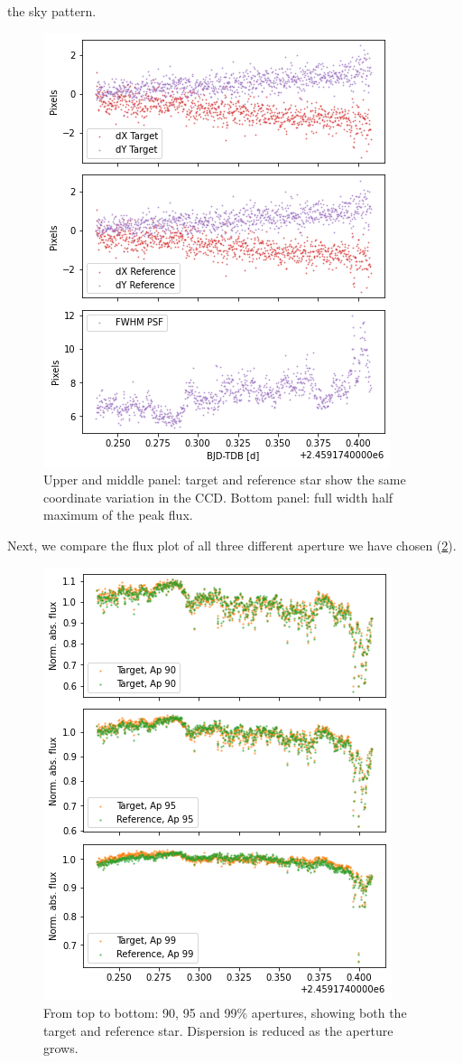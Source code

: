 \documentclass[a4paper,11pt,twocolumn]{article}
\begin{document}
the sky pattern.
\begin{figure}
    \centering  
    \includegraphics[scale=0.5, angle=0]{../pictures/taste/target-ref_position.png}
    \caption{Upper and middle panel: target and reference star show the same 
    coordinate variation in the CCD. Bottom panel: full width half maximum 
    of the peak flux.}
    \label{fig:target-ref_position}
\end{figure}
Next, we compare the flux plot of all three different aperture we have 
chosen (\ref{fig:apertures}).
\begin{figure}
    \centering  
    \includegraphics[scale=0.5, angle=0]{../pictures/taste/apertures.png}
    \caption{From top to bottom: 90, 95 and 99\% apertures, showing 
    both the target and reference star. Dispersion is reduced as the 
    aperture grows.}
    \label{fig:apertures}
\end{figure}
\end{document}
